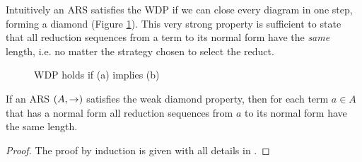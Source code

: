 Intuitively an ARS satisfies the WDP if we can close every diagram in one step, forming a diamond (Figure \ref{figure:diam}). This very strong property is sufficient to state that all reduction sequences from a term to its normal form have the \emph{same} length, i.e. no matter the strategy chosen to select the reduct.
\begin{figure}
	\centering
	\qquad
	\caption{WDP holds if (a) implies (b)}
	\label{figure:diam}
\end{figure}
\begin{lemma}[]\label{lemma:weak}
	If an ARS $(A,\rightarrow)$ satisfies the weak diamond property, then for each term $a\in A$ that has a normal form all reduction sequences from $a$ to its normal form have the same length.
\end{lemma}
\begin{proof}
	The proof by induction is given with all details in \cite{lago_invariant_2005}.
\end{proof}
